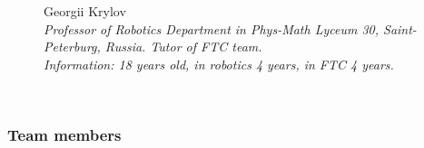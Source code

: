 \begin{figure}[H]
	\begin{minipage}{0.47\linewidth}
		Georgii Krylov \\ 
		\emph{Professor of Robotics Department in Phys-Math Lyceum 30, Saint-Peterburg, Russia. Tutor of FTC team. \\}
		\emph{Information: 18 years old, in robotics 4 years, in FTC 4 years.}
	\end{minipage}	
	\hfill
	\begin{minipage}[h]{0.47\linewidth}
		\\
	\end{minipage}
	\vfill 
\end{figure}

\fillpage

\subsubsection{Team members}

